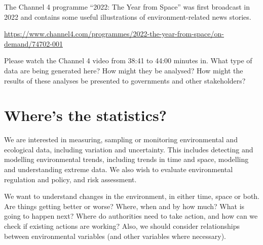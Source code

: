 \documentclass[
  letterpaper,
  DIV=11,
  numbers=noendperiod]{scrartcl}
\begin{document}
\begin{tcolorbox}[enhanced jigsaw, breakable, bottomrule=.15mm, toprule=.15mm, colbacktitle=quarto-callout-note-color!10!white, bottomtitle=1mm, arc=.35mm, opacitybacktitle=0.6, titlerule=0mm, colframe=quarto-callout-note-color-frame, toptitle=1mm, title={Channel 4 programme ``2022: The Year from Space''}, rightrule=.15mm, leftrule=.75mm, left=2mm, colback=white, opacityback=0, coltitle=black]

The Channel 4 programme ``2022: The Year from Space'' was first
broadcast in 2022 and contains some useful illustrations of
environment-related news stories.

\url{https://www.channel4.com/programmes/2022-the-year-from-space/on-demand/74702-001}

\end{tcolorbox}

\begin{tcolorbox}[enhanced jigsaw, breakable, bottomrule=.15mm, toprule=.15mm, colbacktitle=quarto-callout-tip-color!10!white, bottomtitle=1mm, arc=.35mm, opacitybacktitle=0.6, titlerule=0mm, colframe=quarto-callout-tip-color-frame, toptitle=1mm, title={Exercise 2}, rightrule=.15mm, leftrule=.75mm, left=2mm, colback=white, opacityback=0, coltitle=black]

Please watch the Channel 4 video from 38:41 to 44:00 minutes in. What
type of data are being generated here? How might they be analysed? How
might the results of these analyses be presented to governments and
other stakeholders?

\end{tcolorbox}

\section{Where's the statistics?}\label{wheres-the-statistics}

We are interested in measuring, sampling or monitoring environmental and
ecological data, including variation and uncertainty. This includes
detecting and modelling environmental trends, including trends in time
and space, modelling and understanding extreme data. We also wish to
evaluate environmental regulation and policy, and risk assessment.

We want to understand changes in the environment, in either time, space
or both. Are things getting better or worse? Where, when and by how
much? What is going to happen next? Where do authorities need to take
action, and how can we check if existing actions are working? Also, we
should consider relationships between environmental variables (and other
variables where necessary).
\end{document}

